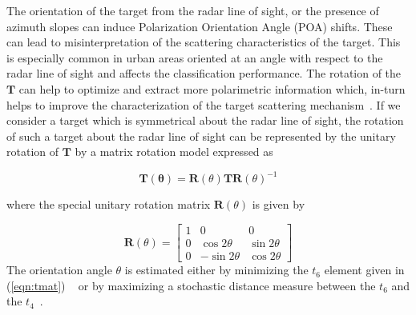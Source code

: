 

The orientation of the target from the radar line of sight, or the presence of azimuth slopes can induce Polarization Orientation Angle (POA) shifts. These can lead to misinterpretation of the scattering characteristics of the target. This is especially common in urban areas oriented at an angle with respect to the radar line of sight and affects the classification performance. The rotation of the $\mathbf{T}$ can help to optimize and extract more polarimetric information which, in-turn helps to improve the characterization of the target scattering mechanism~\cite{bhattacharya2015adaptive}. 
If we consider a %
target which is symmetrical about the radar line of sight, the rotation of such a target about the radar line of sight can be represented by the unitary rotation of  $\mathbf{T}$ by a matrix rotation model expressed as

\begin{equation}
\mathbf{T(\theta)} = \mathbf{R}(\theta) \mathbf{T} \mathbf{R}(\theta)^{-1}
\label{eqn:rotation}
\end{equation}

where the special unitary rotation matrix $\mathbf{R}(\theta)$ is given by

\begin{equation}
\mathbf{R}(\theta) = \begin{bmatrix}
1 & 0 & 0 \\
0 & \cos 2\theta & \sin 2\theta \\
0 & -\sin 2\theta & \cos 2\theta
\end{bmatrix}
\label{eqn:rotDeets}
\end{equation}
The orientation angle $\theta$ is estimated either by minimizing the $t_6$ element given in (\ref{eqn:tmat}) ~\cite{981347} or by  maximizing a  stochastic distance measure between the $t_6$ and the $t_4$~\cite{Bhattacharya2015}.  


